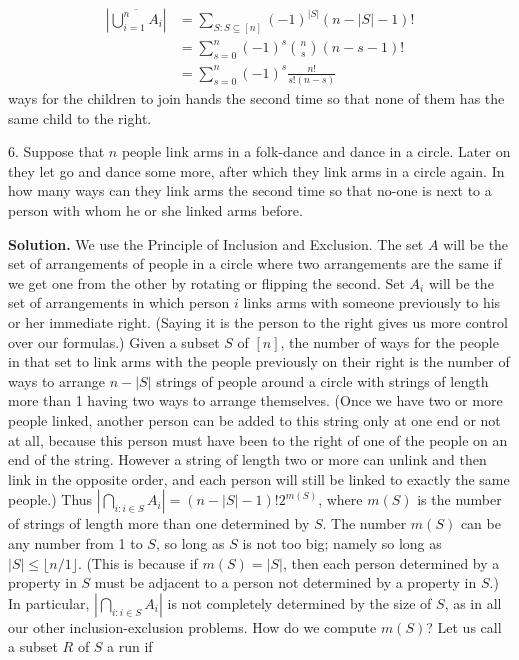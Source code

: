 \documentclass[10pt,]{book}
\theoremstyle{plain}
\theoremstyle{definition}
\theoremstyle{definition}
\numberwithin{equation}{chapter}
\begin{document}
\begin{exerciselist}
\begin{align*}
\left|\overline{\bigcup_{i=1}^n A_i}\right| &=\sum_{S:S\subseteq [n]}
(-1)^{|S|}(n-|S|-1)!\\
&=
\sum_{s=0}^n (-1)^s \binom{n}{s} (n-s-1)!\\
&= \sum_{s=0}^n (-1)^s \frac{n!}{s!(n-s)}
\end{align*}
ways for the children to join hands the second time so that none of them has the same child to the right.%
\item[6.]\hypertarget{Hora}{}Suppose that \(n\) people link arms in a folk-dance and dance in a circle. Later on they let go and dance some more, after which they link arms in a circle again. In how many ways can they link arms the second time so that no-one is next to a person with whom he or she linked arms before.%
\par\smallskip
\par\smallskip
\noindent\textbf{Solution.}\hypertarget{solution-408}{}\quad
We use the Principle of Inclusion and Exclusion. The set \(A\) will be the set of arrangements of people in a circle where two arrangements are the same if we get one from the other by rotating or flipping the second. Set \(A_i\) will be the set of arrangements in which person \(i\) links arms with someone previously to his or her immediate right. (Saying it is the person to the right gives us more control over our formulas.) Given a subset \(S\) of \([n]\), the number of ways for the people in that set to link arms with the people previously on their right is the number of ways to arrange \(n-|S|\) strings of people around a circle with strings of length more than 1 having two ways to arrange themselves.  (Once we have two or more people linked, another person can be added to this string only at one end or not at all, because this person must have been to the right of one of the people on an end of the string. However a string of length two or more can unlink and then link in the opposite order, and each person will still be linked to exactly the same people.) Thus \(\left|\bigcap_{i\colon i\in S}A_i\right|= (n-|S|-1)!2^{m(S)}\), where \(m(S)\) is the number of strings of length more than one determined by \(S\). The number \(m(S)\) can be any number from 1 to \(S\), so long as \(S\) is not too big; namely so long as \(|S|\le \lfloor n/1\rfloor\). (This is because if \(m(S)=|S|\), then each person determined by a property in \(S\) must be adjacent to a person not determined by a property in \(S\).) In particular, \(\left|\bigcap_{i\colon i\in S}A_i\right|\) is not completely determined by the size of \(S\), as in all our other inclusion-exclusion problems. How do we compute \(m(S)\)? Let us call a subset \(R\) of \(S\) a run if \leavevmode%

\end{exerciselist}
\end{document}
